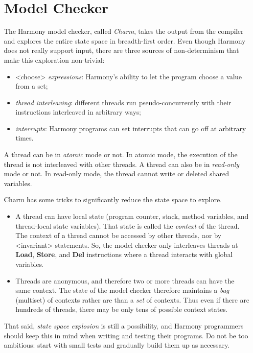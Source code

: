 \documentclass{report}
\begin{document}
\section{Model Checker}

The Harmony model checker, called \emph{Charm}, takes the output from
the compiler and explores the entire state space in breadth-first order.
Even though Harmony does not really support input, there are three sources of
non-determinism that make this exploration non-trivial:

\begin{itemize}
\item <{choose}> \emph{expressions}: Harmony's ability to let the program
choose a value from a set;
\item \emph{thread interleaving}: different threads run pseudo-concurrently
with their instructions interleaved in arbitrary ways;
\item \emph{interrupts}: Harmony programs can set interrupts that can go
off at arbitrary times.
\end{itemize}

A thread can be in \emph{atomic} mode or not.
In atomic mode, the execution of the thread is not interleaved with
other threads.
A thread can also be in \emph{read-only} mode or not.
In read-only mode, the thread cannot write or deleted shared variables.

Charm has some tricks to significantly reduce the state space to explore.
\begin{itemize}
\item A thread can have local state (program counter, stack,
method variables, and thread-local state variables).
That state is called the \emph{context} of the thread.
The context of a thread cannot be accessed by other
threads, nor by <{invariant}> statements.
So, the model checker only interleaves threads at \textbf{Load},
\textbf{Store}, and \textbf{Del} instructions where a thread
interacts with global
variables.
\item Threads are anonymous, and therefore two or more threads can
have the same context.  The state of the model checker therefore maintains
a \emph{bag} (multiset) of contexts rather are than a \emph{set} of contexts.
Thus even if there are hundreds of threads, there may be only tens of
possible context states.
\end{itemize}

That said, \emph{state space explosion} is still a possibility, and
Harmony programmers should keep this in mind when writing and testing
their programs.  Do not be too ambitious: start with small tests and
gradually build them up as necessary.
\end{document}
